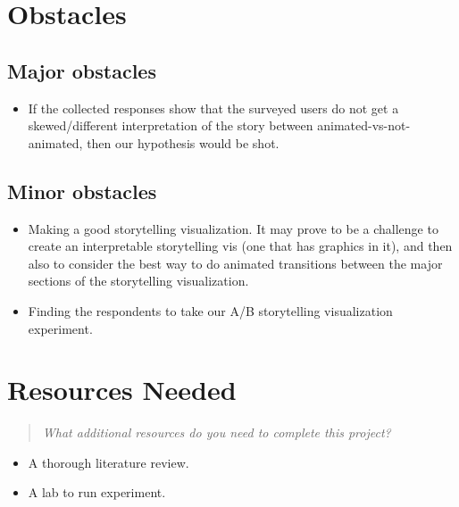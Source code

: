 \documentclass{proc}
\begin{document}
\section{Obstacles}

\subsection{Major obstacles} %

\begin{itemize}
\item If the collected responses show that the surveyed users do not get a skewed/different interpretation of the story between animated-vs-not-animated, then our hypothesis would be shot.
\end{itemize}

\subsection{Minor obstacles}

\begin{itemize}
\item Making a good storytelling visualization. It may prove to be a challenge to create an interpretable storytelling vis (one that has graphics in it), and then also to consider the best way to do animated transitions between the major sections of the storytelling visualization.
\item Finding the respondents to take our A/B storytelling visualization experiment.
\end{itemize}

\section{Resources Needed}
\begin{quote}
\textit{What additional resources do you need to complete this project?}
\end{quote}

\begin{itemize}
\item A thorough literature review.
\item A lab to run experiment.
\end{itemize}
\end{document}
